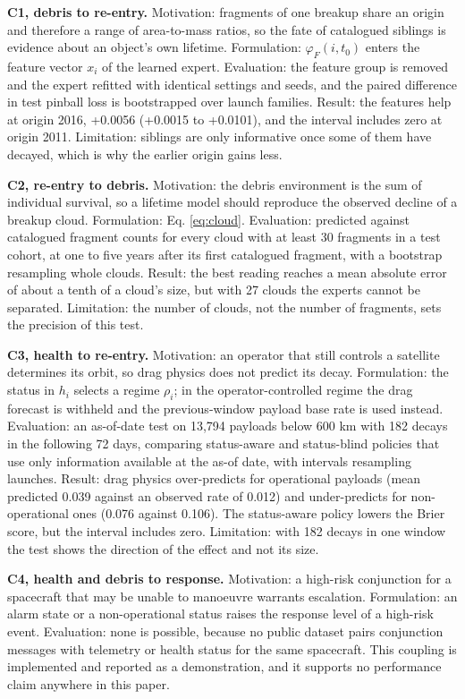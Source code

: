 \documentclass[3p,times,twocolumn]{elsarticle}
\begin{document}
\textbf{C1, debris to re-entry.} Motivation: fragments of one breakup
share an origin and therefore a range of area-to-mass ratios, so the
fate of catalogued siblings is evidence about an object's own lifetime.
Formulation: \(\varphi_F(i,t_0)\) enters the feature vector \(x_i\) of
the learned expert. Evaluation: the feature group is removed and the
expert refitted with identical settings and seeds, and the paired
difference in test pinball loss is bootstrapped over launch families.
Result: the features help at origin 2016, +0.0056 (+0.0015 to +0.0101),
and the interval includes zero at origin 2011. Limitation: siblings are
only informative once some of them have decayed, which is why the
earlier origin gains less.

\textbf{C2, re-entry to debris.} Motivation: the debris environment is
the sum of individual survival, so a lifetime model should reproduce the
observed decline of a breakup cloud. Formulation: Eq. \ref{eq:cloud}.
Evaluation: predicted against catalogued fragment counts for every cloud
with at least 30 fragments in a test cohort, at one to five years after
its first catalogued fragment, with a bootstrap resampling whole clouds.
Result: the best reading reaches a mean absolute error of about a tenth
of a cloud's size, but with 27 clouds the experts cannot be separated.
Limitation: the number of clouds, not the number of fragments, sets the
precision of this test.

\textbf{C3, health to re-entry.} Motivation: an operator that still
controls a satellite determines its orbit, so drag physics does not
predict its decay. Formulation: the status in \(h_i\) selects a regime
\(\rho_i\); in the operator-controlled regime the drag forecast is
withheld and the previous-window payload base rate is used instead.
Evaluation: an as-of-date test on 13,794 payloads below 600 km with 182
decays in the following 72 days, comparing status-aware and status-blind
policies that use only information available at the as-of date, with
intervals resampling launches. Result: drag physics over-predicts for
operational payloads (mean predicted 0.039 against an observed rate of
0.012) and under-predicts for non-operational ones (0.076 against
0.106). The status-aware policy lowers the Brier score, but the interval
includes zero. Limitation: with 182 decays in one window the test shows
the direction of the effect and not its size.

\textbf{C4, health and debris to response.} Motivation: a high-risk
conjunction for a spacecraft that may be unable to manoeuvre warrants
escalation. Formulation: an alarm state or a non-operational status
raises the response level of a high-risk event. Evaluation: none is
possible, because no public dataset pairs conjunction messages with
telemetry or health status for the same spacecraft. This coupling is
implemented and reported as a demonstration, and it supports no
performance claim anywhere in this paper.
\end{document}
